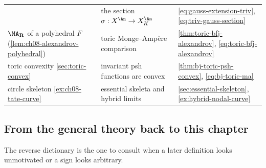 \begin{center}
\begin{tabular}{p{}|p{}|p{}}
  &the section $\sigma:X^{\An}\to X_K^{\An}$
  &\eqref{eq:gauss-extension-triv},
   \eqref{eq:triv-gauss-section}\\
$\MA_{\mathbf R}$ of a polyhedral $F$
   (\cref{lem:ch08-alexandrov-polyhedral})
  &toric Monge--Amp\`ere comparison
  &\cref{thm:toric-bfj-alexandrov},
   \eqref{eq:toric-bfj-alexandrov}\\
toric convexity \cref{sec:toric-convex}
  &invariant psh functions are convex
  &\cref{thm:bj-toric-psh-convex},
   \eqref{eq:bj-toric-ma}\\
circle skeleton \cref{ex:ch08-tate-curve}
  &essential skeleta and hybrid limits
  &\cref{sec:essential-skeleton},
   \cref{ex:hybrid-nodal-curve}
\end{tabular}
\end{center}

\subsection{From the general theory back to this chapter}
\label{sec:ch08-dict-backward}

The reverse dictionary is the one to consult when a later definition looks
unmotivated or a sign looks arbitrary.

